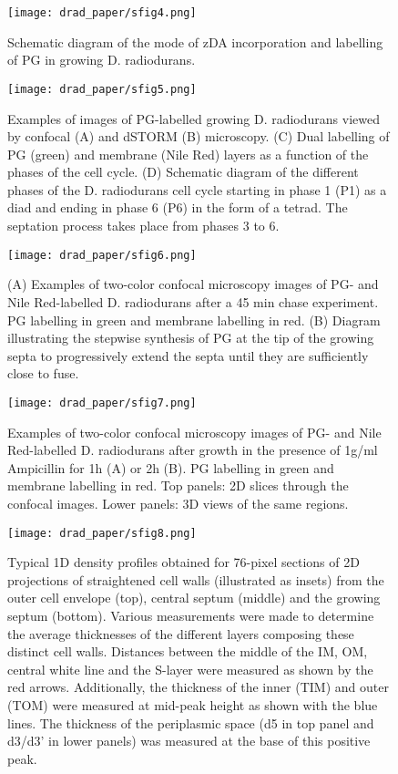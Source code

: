 \begin{figure}[ht]
    \centering
    \texttt{[image: drad\_paper/sfig4.png]}
    \caption[PG labelling schematic]{Schematic diagram of the mode of zDA incorporation and labelling of PG in growing D. radiodurans.}
    \label{drad_sfig4}
\end{figure}

\begin{figure}[ht]
    \centering
    \texttt{[image: drad\_paper/sfig5.png]}
    \caption[PG-labelled D. radiodurans]{Examples of images of PG-labelled growing D. radiodurans viewed by confocal (A) and dSTORM (B) microscopy. (C) Dual labelling of PG (green) and membrane (Nile Red) layers as a function of the phases of the cell cycle. (D) Schematic diagram of the different phases of the D. radiodurans cell cycle starting in phase 1 (P1) as a diad and ending in phase 6 (P6) in the form of a tetrad. The septation process takes place from phases 3 to 6.}
    \label{drad_sfig5}
\end{figure}

\begin{figure}[ht]
    \centering
    \texttt{[image: drad\_paper/sfig6.png]}
    \caption[Two-color labelled chase experiment]{(A) Examples of two-color confocal microscopy images of PG- and Nile Red-labelled D. radiodurans after a 45 min chase experiment. PG labelling in green and membrane labelling in red. (B) Diagram illustrating the stepwise synthesis of PG at the tip of the growing septa to progressively extend the septa until they are sufficiently close to fuse.}
    \label{drad_sfig6}
\end{figure}

\begin{figure}[ht]
    \centering
    \texttt{[image: drad\_paper/sfig7.png]}
    \caption[Two-color labelled chase experiment with Ampicillin]{Examples of two-color confocal microscopy images of PG- and Nile Red-labelled D. radiodurans after growth in the presence of 1\mu{}g/ml Ampicillin for 1h (A) or 2h (B). PG labelling in green and membrane labelling in red. Top panels: 2D slices through the confocal images. Lower panels: 3D views of the same regions.}
    \label{drad_sfig7}
\end{figure}

\begin{figure}[ht]
    \centering
    \texttt{[image: drad\_paper/sfig8.png]}
    \caption[1D density profiles of walls and septa]{Typical 1D density profiles obtained for 76-pixel sections of 2D projections of straightened cell walls (illustrated as insets) from the outer cell envelope (top), central septum (middle) and the growing septum (bottom). Various measurements were made to determine the average thicknesses of the different layers composing these distinct cell walls. Distances between the middle of the IM, OM, central white line and the S-layer were measured as shown by the red arrows. Additionally, the thickness of the inner (TIM) and outer (TOM) were measured at mid-peak height as shown with the blue lines. The thickness of the periplasmic space (d5 in top panel and d3/d3' in lower panels) was measured at the base of this positive peak.}
    \label{drad_sfig8}
\end{figure}
